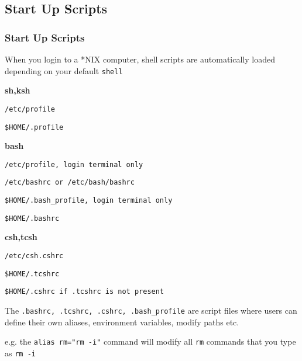 \documentclass[slidestop,mathserif,compress,xcolor=svgnames]{beamer}
\begin{document}
\subsection{Start Up Scripts}
\begin{frame}
  \frametitle{\small Start Up Scripts}
  \begin{itemize}
    {\scriptsize
    \item When you login to a *NIX computer, shell scripts are automatically loaded depending on your default \texttt{shell}
    \item \textbf{sh,ksh}
    \begin{enumerate}
      {\scriptsize
        \item \texttt{/etc/profile}
        \item \texttt{\$HOME/.profile}
      }
    \end{enumerate}
    \item \textbf{bash}
    \begin{enumerate}
      {\scriptsize
        \item \texttt{/etc/profile, login terminal only}
        \item \texttt{/etc/bashrc or /etc/bash/bashrc}
        \item \texttt{\$HOME/.bash\_profile, login terminal only}
        \item \texttt{\$HOME/.bashrc}
      }
    \end{enumerate}
    \item \textbf{csh,tcsh}
    \begin{enumerate}
      {\scriptsize
        \item \texttt{/etc/csh.cshrc}
        \item \texttt{\$HOME/.tcshrc}
        \item \texttt{\$HOME/.cshrc if .tcshrc is not present}
      }
    \end{enumerate}
    \item The \texttt{.bashrc, .tcshrc, .cshrc, .bash\_profile} are script files where users can define their own aliases, environment variables, modify paths etc.
    \item e.g. the \texttt{alias rm="rm -i"} command will modify all \texttt{rm} commands that you type as \texttt{rm -i} 
    }
  \end{itemize}
\end{frame}
\end{document}
